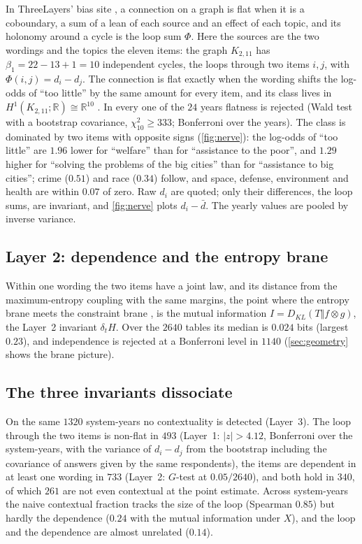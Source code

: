 \documentclass[11pt]{article}
\theoremstyle{definition}
\theoremstyle{remark}
\begin{document}
In ThreeLayers' bias site \cite[\S36]{ThreeLayers}, a connection on a graph is flat when it is a coboundary, a sum of a lean of each
source and an effect of each topic, and its holonomy around a cycle is the loop sum $\Phi$. Here the sources are the two wordings and the
topics the eleven items: the graph $K_{2,11}$ has $\beta_1=22-13+1=10$ independent cycles, the loops through two items $i,j$, with
$\Phi(i,j)=d_i-d_j$. The connection is flat exactly when the wording shifts the log-odds of ``too little'' by the same amount for every item,
and its class lives in $H^1(K_{2,11};\mathbb R)\cong\mathbb R^{10}$ \cite[Thm.~13.3]{ThreeLayers}. In every one of the $24$ years flatness is
rejected (Wald test with a bootstrap covariance, $\chi^2_{10}\ge333$; Bonferroni over the years). The class is dominated by two items with
opposite signs (\cref{fig:nerve}): the log-odds of ``too little'' are $1.96$ lower for ``welfare'' than for ``assistance to the poor'', and $1.29$ higher for ``solving the
problems of the big cities'' than for ``assistance to big cities''; crime ($0.51$) and
race ($0.34$) follow, and space, defense, environment and health are within $0.07$ of zero. Raw $d_i$ are quoted; only their differences, the loop sums, are invariant, and \cref{fig:nerve} plots $d_i-\bar d$. The yearly
values are pooled by inverse variance.

\subsection{Layer 2: dependence and the entropy brane}

Within one wording the two items have a joint law, and its distance from the maximum-entropy coupling with the same margins, the point
where the entropy brane meets the constraint brane \cite[Thm.~3.1]{Bridges}, is the mutual information $I=D_{KL}(T\Vert f\otimes g)$, the
Layer~2 invariant $\delta_tH$. Over the $2640$ tables its median is $0.024$ bits (largest $0.23$), and independence is rejected at a
Bonferroni level in $1140$ (\cref{sec:geometry} shows the brane picture).

\subsection{The three invariants dissociate}

On the same $1320$ system-years no contextuality is detected (Layer~3). The loop through the two items is non-flat in $493$
(Layer~1: $\lvert z\rvert>4.12$, Bonferroni over the system-years, with the variance of $d_i-d_j$ from the bootstrap including the
covariance of answers given by the same respondents), the items are dependent in at least one wording in $733$ (Layer~2: $G$-test at
$0.05/2640$), and both hold in $340$, of which $261$ are not even contextual at the point estimate. Across system-years the naive
contextual fraction tracks the size of the loop (Spearman $0.85$) but hardly the dependence ($0.24$ with the mutual information under
$X$), and the loop and the dependence are almost unrelated ($0.14$).
\end{document}
